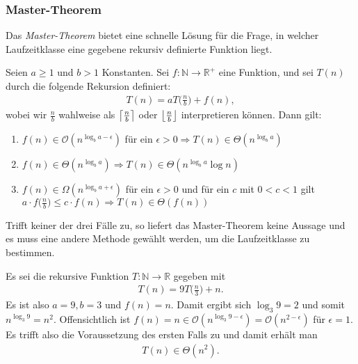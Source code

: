 \subsubsection{Master-Theorem}
Das \emph{Master-Theorem} bietet eine schnelle Lösung für die Frage, in welcher Laufzeitklasse eine gegebene rekursiv definierte Funktion liegt.

\begin{satz}
	Seien $a \ge 1$ und  $b > 1$ Konstanten. Sei $f : \mathbb{N} \rightarrow \mathbb{R}^{+}$ eine Funktion, und sei $T(n)$ durch die folgende Rekursion definiert:
	\begin{gather*}
		T(n) = a T\Big(\frac{n}{b}\Big) + f(n),
	\end{gather*}
	wobei wir $\frac{n}{b}$ wahlweise als $\ceil[\big]{\frac{n}{b}}$ oder $\floor[\big]{\frac{n}{b}}$ interpretieren können. Dann gilt:
	\begin{enumerate}
		\item $f(n) \in \mathcal{O}(n^{\log_b{a - \epsilon}})$ für ein $\epsilon > 0 \Rightarrow T(n) \in \Theta(n^{\log_b{a}})$

		\item $f(n) \in \Theta(n^{\log_b{a}}) \Rightarrow T(n) \in \Theta(n^{\log_b{a}} \log n)$

		\item $f(n) \in \Omega(n^{\log_b{a + \epsilon}})$ für ein $\epsilon > 0$ und für ein $c$ mit $0 < c < 1$ gilt \\
		      $a \cdot f\big(\frac{n}{b}\big) \le c \cdot f(n) \Rightarrow T(n) \in \Theta(f(n))$
	\end{enumerate}
\end{satz}
\begin{anm}
	Trifft keiner der drei Fälle zu, so liefert das Master-Theorem keine Aussage und es muss eine andere Methode gewählt werden, um die Laufzeitklasse zu bestimmen.
\end{anm}

\begin{bsp}
	Es sei die rekursive Funktion $T : \mathbb{N} \rightarrow \mathbb{R}$ gegeben mit
	\begin{gather*}
		T(n) = 9 T\big(\frac{n}{3}\big) + n.
	\end{gather*}
	Es ist also $a = 9, b = 3$ und $f(n) = n$. Damit ergibt sich $\log_3 9 = 2$ und somit $n^{\log_3 9} = n^2$. Offensichtlich ist $f(n) = n \in \mathcal{O}(n^{\log_3 9 - \epsilon}) = \mathcal{O}(n^{2 - \epsilon})$ für $\epsilon = 1$. Es trifft also die Voraussetzung des ersten Falls zu und damit erhält man
	\begin{gather*}
		T(n) \in \Theta(n^2).
	\end{gather*}
\end{bsp}


